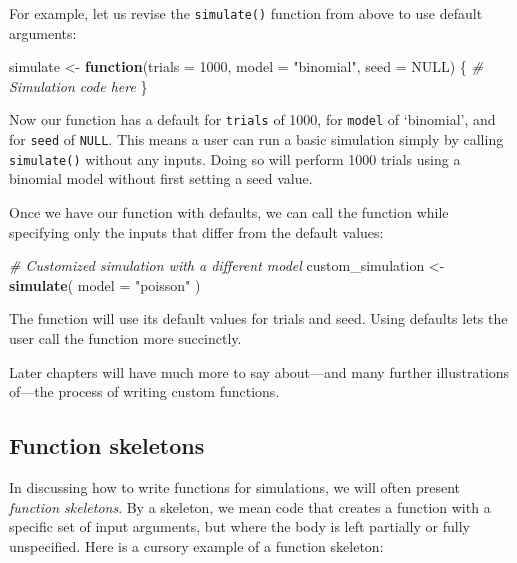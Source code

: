 \documentclass[
]{book}
\newenvironment{Shaded}{\begin{snugshade}}{\end{snugshade}}
\newcommand{\AttributeTok}[1]{\textcolor[rgb]{0.13,0.29,0.53}{#1}}
\newcommand{\CommentTok}[1]{\textcolor[rgb]{0.56,0.35,0.01}{\textit{#1}}}
\newcommand{\ConstantTok}[1]{\textcolor[rgb]{0.56,0.35,0.01}{#1}}
\newcommand{\ControlFlowTok}[1]{\textcolor[rgb]{0.13,0.29,0.53}{\textbf{#1}}}
\newcommand{\DecValTok}[1]{\textcolor[rgb]{0.00,0.00,0.81}{#1}}
\newcommand{\FunctionTok}[1]{\textcolor[rgb]{0.13,0.29,0.53}{\textbf{#1}}}
\newcommand{\NormalTok}[1]{#1}
\newcommand{\OtherTok}[1]{\textcolor[rgb]{0.56,0.35,0.01}{#1}}
\newcommand{\StringTok}[1]{\textcolor[rgb]{0.31,0.60,0.02}{#1}}
\begin{document}
For example, let us revise the \texttt{simulate()} function from above to use default arguments:

\begin{Shaded}
\begin{Highlighting}[]
\NormalTok{simulate }\OtherTok{\textless{}{-}} \ControlFlowTok{function}\NormalTok{(}\AttributeTok{trials =} \DecValTok{1000}\NormalTok{, }\AttributeTok{model =} \StringTok{"binomial"}\NormalTok{, }\AttributeTok{seed =} \ConstantTok{NULL}\NormalTok{) \{}
  \CommentTok{\# Simulation code here}
\NormalTok{\}}
\end{Highlighting}
\end{Shaded}

Now our function has a default for \texttt{trials} of 1000, for \texttt{model} of `binomial', and for \texttt{seed} of \texttt{NULL}.
This means a user can run a basic simulation simply by calling \texttt{simulate()} without any inputs. Doing so will perform 1000 trials using a binomial model without first setting a seed value.

Once we have our function with defaults, we can call the function while specifying only the inputs that differ from the default values:

\begin{Shaded}
\begin{Highlighting}[]
\CommentTok{\# Customized simulation with a different model}
\NormalTok{custom\_simulation }\OtherTok{\textless{}{-}} \FunctionTok{simulate}\NormalTok{( }\AttributeTok{model =} \StringTok{"poisson"}\NormalTok{ )}
\end{Highlighting}
\end{Shaded}

The function will use its default values for trials and seed.
Using defaults lets the user call the function more succinctly.

Later chapters will have much more to say about---and many further illustrations of---the process of writing custom functions.

\subsection{Function skeletons}\label{function-skeletons}

In discussing how to write functions for simulations, we will often present \emph{function skeletons}. By a skeleton, we mean code that creates a function with a specific set of input arguments, but where the body is left partially or fully unspecified.
Here is a cursory example of a function skeleton:
\end{document}
